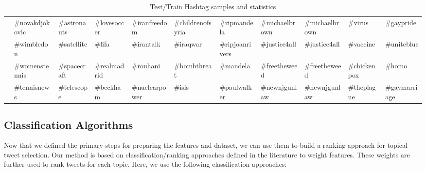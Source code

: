 \begin{table*}[t!]
{{\begin{tabular}{|l|l|l|l|l|l|l|l|l|l|l|}
                                          & \#novakdjokovic                      & \#astronauts                        & \#lovesoccer                         & \#iranfreedom                          & \#childrenofsyria                           & \#ripmandela                                 & \#michaelbrown                             & \#michaelbrown                                & \#virus                                 & \#gaypride                         \\ \cline{2-11} 
                                          & \#wimbledon                          & \#satellite                         & \#fifa                               & \#irantalk                             & \#iraqwar                                   & \#ripjoanrivers                              & \#justice4all                              & \#justice4all                                 & \#vaccine                               & \#uniteblue                        \\ \cline{2-11} 
                                          & \#womenstennis                       & \#spacecraft                        & \#realmadrid                         & \#rouhani                              & \#bombthreat                                & \#mandela                                    & \#freetheweed                              & \#freetheweed                                 & \#chickenpox                            & \#homo                             \\ \cline{2-11} 
                                          & \#tennisnews                         & \#telescope                         & \#beckham                            & \#nuclearpower                         & \#isis                                      & \#paulwalker                                 & \#newnjgunlaw                              & \#newnjgunlaw                                 & \#theplague                             & \#gaymarriage                      \\ \hline
\end{tabular}
}
}
\caption{Test/Train Hashtag samples and statistics}
\label{table:sampleHashtags}
\end{table*}

\subsection{Classification Algorithms}
Now that we defined the primary steps for preparing the features and dataset, we can use them to build a ranking approach for topical tweet selection. Our method is based on classification/ranking approaches defined in the literature to weight features. These weights are further used to rank tweets for each topic. Here, we use the following classification approaches:

